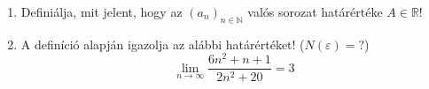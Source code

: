 \documentclass[11pt]{scrartcl}
\begin{document}
\begin{enumerate}
	\item Definiálja, mit jelent, hogy az $(a_n)_{n \in \mathbb{N}}$ valós
	      sorozat határértéke $A \in \mathbb{R}$!

	\item A definíció alapján igazolja az alábbi határértéket!
	      ($N(\varepsilon) = ?$)
	      \[
		      \lim_{n \to \infty} \frac{6n^2 + n + 1}{2n^2 + 20} = 3
	      \]
\end{enumerate}
\end{document}
